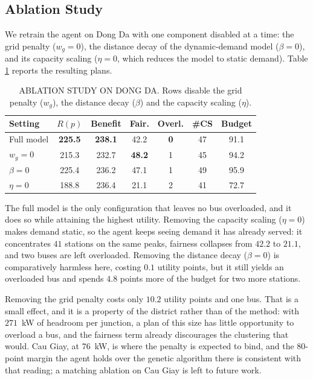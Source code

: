 \documentclass[10pt, conference, a4paper, compsocconf]{IEEEtran}
\begin{document}
\subsection{Ablation Study}

We retrain the agent on Dong Da with one component disabled at a time: the grid penalty ($w_g=0$), the distance decay of the dynamic-demand model ($\beta=0$), and its capacity scaling ($\eta=0$, which reduces the model to static demand). Table \ref{tab:ablation} reports the resulting plans.

\begin{table}[t]
\renewcommand{\arraystretch}{1.15}
\setlength{\tabcolsep}{4pt}
\caption{\uppercase{Ablation study on Dong Da}. Rows disable the grid penalty
($w_g$), the distance decay ($\beta$) and the capacity scaling ($\eta$).}
\label{tab:ablation}
\centering
\footnotesize
\begin{tabular}{lcccccc}
\toprule
Setting & $R(p)$ & Benefit & Fair. & Overl. & \#CS & Budget \\
\midrule
Full model    & \textbf{225.5} & \textbf{238.1} & 42.2 & \textbf{0} & 47 & 91.1 \\
$w_g{=}0$     & 215.3 & 232.7 & \textbf{48.2} & 1 & 45 & 94.2 \\
$\beta{=}0$   & 225.4 & 236.2 & 47.1 & 1 & 49 & 95.9 \\
$\eta{=}0$    & 188.8 & 236.4 & 21.1 & 2 & 41 & 72.7 \\
\bottomrule
\end{tabular}
\end{table}

The full model is the only configuration that leaves no bus overloaded, and it does so while attaining the highest utility. Removing the capacity scaling ($\eta=0$) makes demand static, so the agent keeps seeing demand it has already served: it concentrates $41$ stations on the same peaks, fairness collapses from $42.2$ to $21.1$, and two buses are left overloaded. Removing the distance decay ($\beta=0$) is comparatively harmless here, costing $0.1$ utility points, but it still yields an overloaded bus and spends $4.8$ points more of the budget for two more stations.

Removing the grid penalty costs only $10.2$ utility points and one bus. That is a small effect, and it is a property of the district rather than of the method: with $271$~kW of headroom per junction, a plan of this size has little opportunity to overload a bus, and the fairness term already discourages the clustering that would. Cau Giay, at $76$~kW, is where the penalty is expected to bind, and the $80$-point margin the agent holds over the genetic algorithm there is consistent with that reading; a matching ablation on Cau Giay is left to future work.
\end{document}
